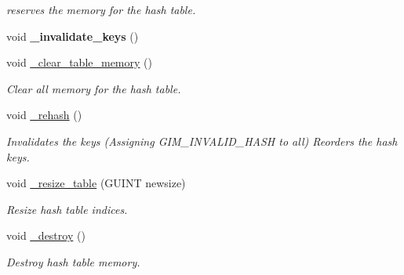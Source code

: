 \begin{DoxyCompactItemize}
\begin{DoxyCompactList}\small\item\em reserves the memory for the hash table. \end{DoxyCompactList}\item 
\mbox{\label{classgim__hash__table_ab638970e2ec565cc9cfd473612127358}} 
void {\bfseries \+\_\+invalidate\+\_\+keys} ()
\item 
\mbox{\label{classgim__hash__table_a06933fdb198971dcd753564d1d6e9424}} 
void \hyperlink{classgim__hash__table_a06933fdb198971dcd753564d1d6e9424}{\+\_\+clear\+\_\+table\+\_\+memory} ()
\begin{DoxyCompactList}\small\item\em Clear all memory for the hash table. \end{DoxyCompactList}\item 
\mbox{\label{classgim__hash__table_aa33115e75d8cc5c489fa6ce8b1a23654}} 
void \hyperlink{classgim__hash__table_aa33115e75d8cc5c489fa6ce8b1a23654}{\+\_\+rehash} ()
\begin{DoxyCompactList}\small\item\em Invalidates the keys (Assigning G\+I\+M\+\_\+\+I\+N\+V\+A\+L\+I\+D\+\_\+\+H\+A\+SH to all) Reorders the hash keys. \end{DoxyCompactList}\item 
\mbox{\label{classgim__hash__table_a51905040dee4c41954f5de1634c090dd}} 
void \hyperlink{classgim__hash__table_a51905040dee4c41954f5de1634c090dd}{\+\_\+resize\+\_\+table} (G\+U\+I\+NT newsize)
\begin{DoxyCompactList}\small\item\em Resize hash table indices. \end{DoxyCompactList}\item 
\mbox{\label{classgim__hash__table_a2b7a2b3eb817edf8af93a85ce910a5ca}} 
void \hyperlink{classgim__hash__table_a2b7a2b3eb817edf8af93a85ce910a5ca}{\+\_\+destroy} ()
\begin{DoxyCompactList}\small\item\em Destroy hash table memory. \end{DoxyCompactList}\item 
\mbox{\label{classgim__hash__table_a93e5bf5c573a39e21e9bd0a4aec38e1a}} 

\end{DoxyCompactItemize}
